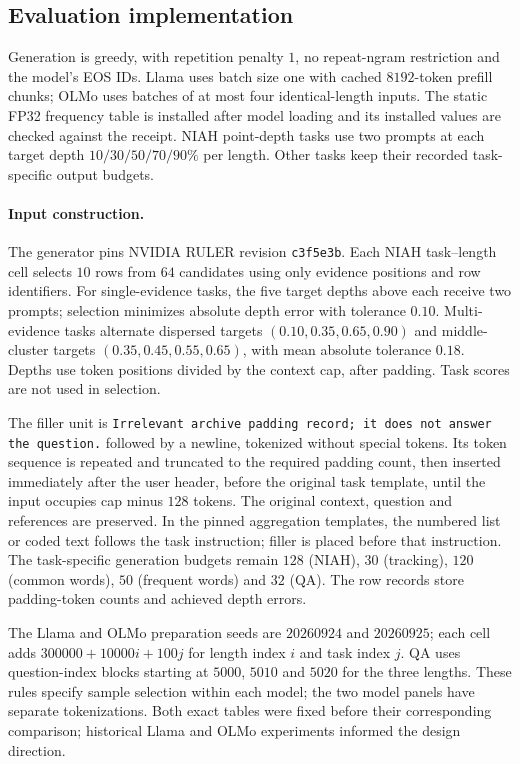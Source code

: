 \subsection{Evaluation implementation}
\label{sec:tailspline-implementation}
Generation is greedy, with repetition penalty $1$, no repeat-ngram restriction and the model's EOS IDs. Llama uses batch size one with cached $8192$-token prefill chunks; OLMo uses batches of at most four identical-length inputs. The static FP32 frequency table is installed after model loading and its installed values are checked against the receipt. NIAH point-depth tasks use two prompts at each target depth $10/30/50/70/90\%$ per length. Other tasks keep their recorded task-specific output budgets.

\paragraph{Input construction.}
The generator pins NVIDIA RULER revision \texttt{c3f5e3b}. Each NIAH task--length cell selects $10$ rows from $64$ candidates using only evidence positions and row identifiers. For single-evidence tasks, the five target depths above each receive two prompts; selection minimizes absolute depth error with tolerance $0.10$. Multi-evidence tasks alternate dispersed targets $(0.10,0.35,0.65,0.90)$ and middle-cluster targets $(0.35,0.45,0.55,0.65)$, with mean absolute tolerance $0.18$. Depths use token positions divided by the context cap, after padding. Task scores are not used in selection.

The filler unit is \texttt{Irrelevant archive padding record; it does not answer the question.} followed by a newline, tokenized without special tokens. Its token sequence is repeated and truncated to the required padding count, then inserted immediately after the user header, before the original task template, until the input occupies cap minus $128$ tokens. The original context, question and references are preserved. In the pinned aggregation templates, the numbered list or coded text follows the task instruction; filler is placed before that instruction. The task-specific generation budgets remain $128$ (NIAH), $30$ (tracking), $120$ (common words), $50$ (frequent words) and $32$ (QA). The row records store padding-token counts and achieved depth errors.

The Llama and OLMo preparation seeds are $20260924$ and $20260925$; each cell adds $300000+10000i+100j$ for length index $i$ and task index $j$. QA uses question-index blocks starting at $5000$, $5010$ and $5020$ for the three lengths. These rules specify sample selection within each model; the two model panels have separate tokenizations. Both exact tables were fixed before their corresponding comparison; historical Llama and OLMo experiments informed the design direction.

